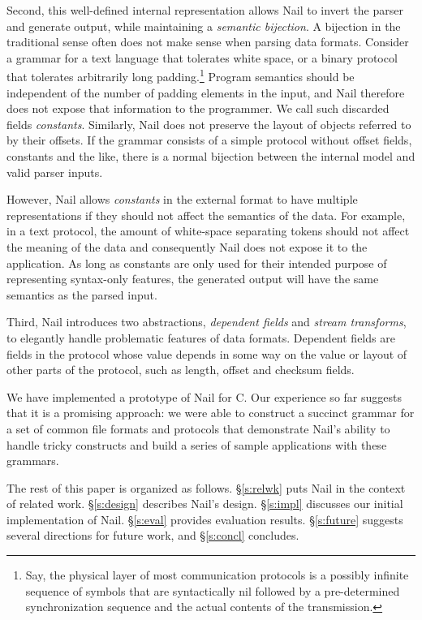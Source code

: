 Second, this well-defined internal representation allows Nail to invert the
parser and generate output, while maintaining a \emph{semantic bijection}.
A bijection in the traditional sense often does not make sense when parsing data formats. 
Consider a grammar for a
text language that tolerates white space, or a binary protocol that tolerates
arbitrarily long padding.\footnote{Say, the physical layer of most communication
  protocols is a possibly infinite sequence of symbols that are syntactically
  nil followed by a pre-determined synchronization sequence and the actual
  contents of the transmission.} Program semantics should be
independent of the number of padding elements in the input, and Nail therefore
does not expose that information to the programmer. We call such discarded
fields \emph{constants}. 
Similarly, Nail does not preserve the layout of
objects referred to by their offsets. If the grammar consists of a simple protocol without offset
fields, constants and the like, there is a normal bijection between the internal model and valid
parser inputs.



 However, Nail allows \emph{constants} in the
external format to have multiple representations if they should not affect the
semantics of the data. For example, in a text protocol, the amount of
white-space separating tokens should not affect the meaning of the data and
consequently Nail does not expose it to the application. As long as
constants are only used for their intended purpose of representing syntax-only
features, the generated output will have the same semantics as the parsed input.

Third, Nail introduces two abstractions, \emph{dependent fields} and \emph{stream transforms}, to
elegantly handle problematic features of data formats. Dependent fields are fields in the protocol
whose value depends in some way on the value or layout of other parts of the protocol, such as
length, offset and checksum fields. 

We have implemented a prototype of Nail for C\@.  Our experience
so far suggests that it is a promising approach: we were able to construct
a succinct grammar for a set of common file formats and protocols that demonstrate Nail's ability to
handle tricky constructs and build a series of sample applications with these grammars. 

The rest of this paper is organized as follows.  \S\ref{s:relwk}
puts Nail in the context of related work.  \S\ref{s:design} describes
Nail's design.  \S\ref{s:impl} discusses our initial implementation
of Nail.  \S\ref{s:eval} provides evaluation results.
\S\ref{s:future} suggests several directions for future work, and
\S\ref{s:concl} concludes.

